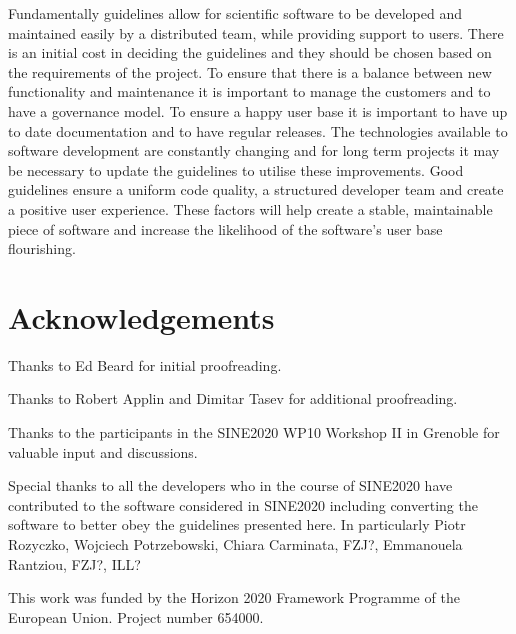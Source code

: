 \documentclass[jnr]{iosart2x}
\begin{document}
Fundamentally guidelines allow for scientific software to be developed and maintained easily by a distributed team, while providing support to users.
There is an initial cost in deciding the guidelines and they should be chosen based on the requirements of the project.
To ensure that there is a balance between new functionality and maintenance it is important to manage the customers and to have a governance model.
To ensure a happy user base it is important to have up to date documentation and to have regular releases.
The technologies available to software development are constantly changing and for long term projects it may be necessary to update the guidelines to utilise these improvements.
Good guidelines ensure a uniform code quality, a structured developer team and create a positive user experience.
These factors will help create a stable, maintainable piece of software and increase the likelihood of the software's user base flourishing.

\section{Acknowledgements}
\label{Acknowledgements}

Thanks to Ed Beard for initial proofreading.

Thanks to Robert Applin and Dimitar Tasev for additional proofreading.

Thanks to the participants in the SINE2020 WP10 Workshop II in Grenoble for valuable input and discussions.

Special thanks to all the developers who in the course of SINE2020 have contributed to the software considered in SINE2020 including converting the software to better obey the guidelines presented here.
In particularly Piotr Rozyczko, Wojciech Potrzebowski, Chiara Carminata, FZJ?, Emmanouela Rantziou, FZJ?, ILL?

This work was funded by the Horizon 2020 Framework Programme of the European Union.
Project number 654000.



\nocite{*}


\end{document}
